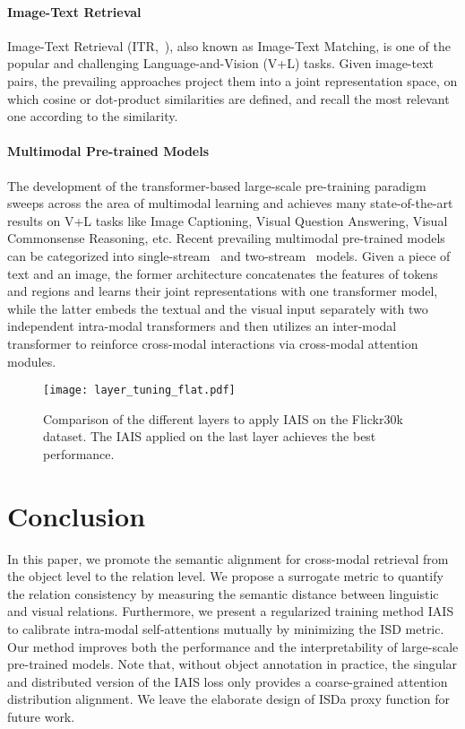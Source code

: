 \documentclass[11pt,a4paper]{article}
\begin{document}
\paragraph{Image-Text Retrieval}
Image-Text Retrieval (ITR,~\citealp{Matching-Words-and-Pictures, Learning-the-Semantics-of-Words-and-Pictures}), also known as Image-Text Matching, is one of the popular and challenging Language-and-Vision (V+L) tasks. 
Given image-text pairs, the prevailing approaches project them into a joint representation space, on which cosine or dot-product similarities are defined, and recall the most relevant one according to the similarity. 


\paragraph{Multimodal Pre-trained Models}
The development of the transformer-based large-scale pre-training paradigm sweeps across the area of multimodal learning and achieves many state-of-the-art results on V+L tasks like Image Captioning, Visual Question Answering, Visual Commonsense Reasoning, etc. Recent prevailing multimodal pre-trained models can be categorized into single-stream~\cite{UNITER, VILLA, Inter-BERT, Oscar, VL-BERT, m6} and two-stream~\cite{ERNIE-ViL, LXMERT, ViLBERT} models. Given a piece of text and an image, the former architecture concatenates the features of tokens and regions and learns their joint representations with one transformer model, while the latter embeds the textual and the visual input separately with two independent intra-modal transformers and then utilizes an inter-modal transformer to reinforce cross-modal interactions via cross-modal attention modules. 

\begin{figure}[t!]
    \centering
    \texttt{[image: layer\_tuning\_flat.pdf]}
    \caption{Comparison of the different layers to apply IAIS on the Flickr30k dataset. The IAIS applied on the last layer achieves the best performance.}
    \label{fig:layer_tuning}
\end{figure}

\section{Conclusion}
In this paper, we promote the semantic alignment for cross-modal retrieval from the object level to the relation level.
We propose a surrogate metric to quantify the relation consistency by measuring the semantic distance between linguistic and visual relations. 
Furthermore, we present a regularized training method IAIS to calibrate intra-modal self-attentions mutually by minimizing the ISD metric. 
Our method improves both the performance and the interpretability of large-scale pre-trained models. Note that, without object annotation in practice, the singular and distributed version of the IAIS loss only provides a coarse-grained attention distribution alignment. 
We leave the elaborate design of ISDa proxy function for future work. 
\end{document}
